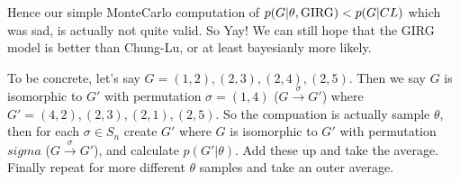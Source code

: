 Hence our simple MonteCarlo computation of $p(G | \theta, \mathrm{GIRG}) < p(G | CL)$ which was sad, is actually not quite valid. So Yay! We can still hope that the GIRG model is better than Chung-Lu, or at least bayesianly more likely.

To be concrete, let's say $G=(1,2), (2, 3), (2, 4), (2, 5)$. Then we say $G$ is isomorphic to $G'$ with permutation $\sigma= (1,4)$ ($G \stackrel{\sigma}{\to} G'$) where $G' = (4, 2), (2, 3), (2, 1), (2, 5)$. So the compuation is actually sample $\theta$,  then for each $\sigma \in S_n$ create $G'$ where $G$ is isomorphic to $G'$ with permutation $sigma$ ($G \stackrel{\sigma}{\to} G'$), and calculate $p(G' | \theta)$. Add these up and take the average.
Finally repeat for more different $\theta$ samples and take an outer average.


  
  

